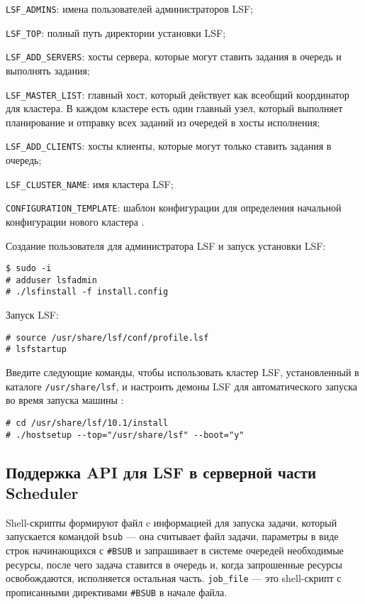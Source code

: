 \lstinline{LSF_ADMINS}: имена пользователей администраторов LSF;

\lstinline{LSF_TOP}: полный путь директории установки LSF;

\lstinline{LSF_ADD_SERVERS}: хосты сервера, которые могут ставить задания в очередь и выполнять задания;

\lstinline{LSF_MASTER_LIST}: главный хост, который действует как всеобщий координатор для кластера. В каждом кластере есть один главный узел, который выполняет планирование и отправку всех заданий из очередей в хосты исполнения;

\lstinline{LSF_ADD_CLIENTS}: хосты клиенты, которые могут только ставить задания в очередь;

\lstinline{LSF_CLUSTER_NAME}: имя кластера LSF;

\lstinline{CONFIGURATION_TEMPLATE}: шаблон конфигурации для определения начальной конфигурации нового кластера \cite{lsf_overview, host_types_models}.

Создание пользователя для администратора LSF и запуск установки LSF:

\begin{lstlisting}
$ sudo -i
# adduser lsfadmin
# ./lsfinstall -f install.config
\end{lstlisting}

Запуск LSF:

\begin{lstlisting}
# source /usr/share/lsf/conf/profile.lsf
# lsfstartup
\end{lstlisting}

Введите следующие команды, чтобы использовать кластер LSF, установленный в каталоге \lstinline{/usr/share/lsf}, и настроить демоны LSF для автоматического запуска во время запуска машины \cite{configuring-cluster}:

\begin{lstlisting}
# cd /usr/share/lsf/10.1/install
# ./hostsetup --top="/usr/share/lsf" --boot="y"
\end{lstlisting}


\subsection{Поддержка API для LSF в серверной части Scheduler}

Shell-скрипты формируют файл c информацией для запуска задачи, который запускается командой \lstinline{bsub} --- она считывает файл задачи, параметры в виде строк начинающихся с \lstinline{#BSUB} и запрашивает в системе очередей необходимые ресурсы, после чего задача ставится в очередь и, когда запрошенные ресурсы освобождаются, исполняется остальная часть. \lstinline{job_file} --- это shell-скрипт с прописанными директивами \lstinline{#BSUB} в начале файла.

